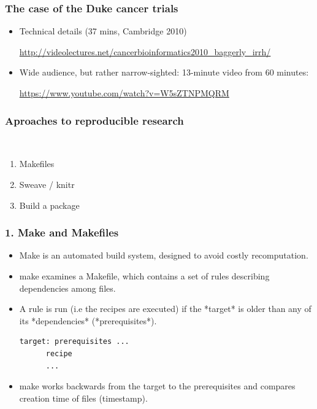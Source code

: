 \documentclass[]{beamer}\usepackage[]{graphicx}\usepackage[]{color}
\begin{document}
\begin{frame}
  \frametitle{The case of the Duke cancer trials}

  \begin{itemize}
  \item  Technical details (37 mins, Cambridge 2010)
    
    \url{http://videolectures.net/cancerbioinformatics2010_baggerly_irrh/}

  \item Wide audience, but rather narrow-sighted: 13-minute video
    from 60 minutes:

    \url{https://www.youtube.com/watch?v=W5sZTNPMQRM}

  \end{itemize}
\end{frame}

\begin{frame}
  \frametitle{Aproaches to reproducible research}\
  \begin{enumerate}
  \item Makefiles
  \item Sweave / knitr
  \item Build a package
  \end{enumerate}
\end{frame}


\begin{frame}[fragile]
  \frametitle{1. Make and Makefiles}

  \begin{itemize}
    
\item Make is an automated build system, designed to avoid costly
  recomputation.

\item make examines a Makefile, which contains a set of rules describing
  dependencies among files.

\item A rule is run (i.e the recipes are executed) if the *target* is older than 
  any of its *dependencies* (*prerequisites*). 

\begin{verbatim}
target: prerequisites ...
      recipe
      ...
\end{verbatim}
  
\item make works backwards from the target to the prerequisites and
compares creation time of files (timestamp).
\end{itemize}

\end{frame}
\end{document}
